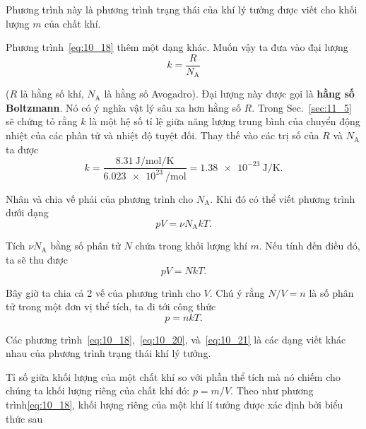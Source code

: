 \noindent
Phương trình này là phương trình trạng thái của khí lý tưởng được viết cho khối lượng $m$ của chất khí.

Phương trình~\eqref{eq:10_18} thêm một dạng khác. Muốn vậy ta đưa vào đại lượng
\begin{equation}\label{eq:10_19}
	k = \frac{R}{N_{\text{A}}}
\end{equation}

\noindent
($R$ là hằng số khí, $N_{\text{A}}$ là hằng số Avogadro). Đại lượng này được gọi là \textbf{hằng số Boltzmann}. Nó có ý nghĩa vật lý sâu xa hơn hằng số $R$. Trong Sec.~\ref{sec:11_5} sẽ chứng tỏ rằng $k$ là một hệ số tỉ lệ giữa năng lượng trung bình của chuyển động nhiệt của các phân tử và nhiệt độ tuyệt đối. Thay thế vào  các trị số của $R$ và $N_{\text{A}}$ ta được
\begin{equation*}
	k = \frac{\SI{8.31}{\joule\per\mole\per\kelvin}}{\SI{6.023e23}{\per\mole}} = \SI{1.38e-23}{\joule\per\kelvin}.
\end{equation*}

Nhân và chia vế phải của phương trình  cho $N_{\text{A}}$. Khi đó có thể viết phương trình dưới dạng
\begin{equation*}
	pV = \nu N_{\text{A}} k T.
\end{equation*}

\noindent
Tích $\nu N_{\text{A}}$ bằng số phân tử $N$ chứa trong khối lượng khí $m$. Nếu tính đến điều đó, ta sẽ thu được
\begin{equation}\label{eq:10_20}
	pV = NkT.
\end{equation}

Bây giờ ta chia cả 2 vế của phương trình  cho $V$. Chú ý rằng $N/V=n$ là số phân tử trong một đơn vị thể tích, ta đi tới công thức
\begin{equation}\label{eq:10_21}
	p = nkT.
\end{equation}

Các phương trình~\eqref{eq:10_18},~\eqref{eq:10_20}, và~\eqref{eq:10_21} là các dạng viết khác nhau của phương trình trạng thái khí lý tưởng.


Tỉ số giữa khối lượng của một chất khí so với phần thể tích mà nó chiếm cho chúng ta khối lượng riêng của chất khí đó: $p = m/V$. Theo như phương trình\eqref{eq:10_18}, khối lượng riêng của một khí lí tưởng được xác định bởi biểu thức sau

